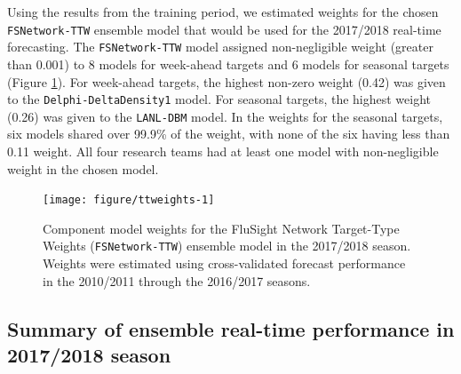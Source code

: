 \documentclass{article}\usepackage[]{graphicx}\usepackage[]{color}
\newenvironment{knitrout}{}{} %
\begin{document}
Using the results from the training period, we estimated weights for the chosen {\tt FSNetwork-TTW} ensemble model that would be used for the 2017/2018 real-time forecasting.
The {\tt FSNetwork-TTW} model assigned non-negligible weight (greater than 0.001) to 8 models for week-ahead targets and 6 models for seasonal targets (Figure \ref{fig:ttweights}).
For week-ahead targets, the highest non-zero weight 
(0.42) 
was given to the {\tt Delphi-DeltaDensity1} model.
For seasonal targets, the highest weight 
(0.26) 
was given to the {\tt LANL-DBM} model.
In the weights for the seasonal targets, six models shared over 99.9\% of the weight, with none of the six having less than 0.11 weight.
All four research teams had at least one model with non-negligible weight in the chosen model. 

\begin{knitrout}
\color{fgcolor}\begin{figure}
\texttt{[image: figure/ttweights-1]} \caption[Component model weights for the FluSight Network Target-Type Weights ({\tt FSNetwork-TTW}) ensemble model in the 2017/2018 season]{Component model weights for the FluSight Network Target-Type Weights ({\tt FSNetwork-TTW}) ensemble model in the 2017/2018 season. Weights were estimated using cross-validated forecast performance in the 2010/2011 through the 2016/2017 seasons.}\label{fig:ttweights}
\end{figure}


\end{knitrout}





\subsection*{Summary of ensemble real-time performance in 2017/2018 season}
\end{document}
